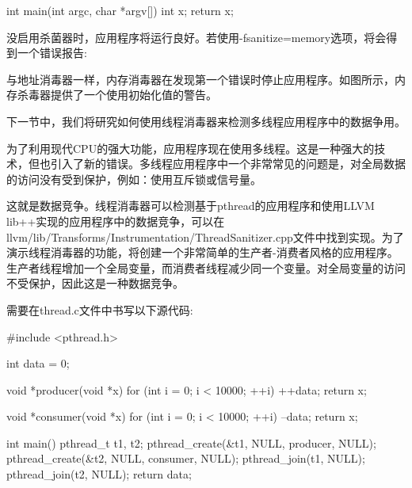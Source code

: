 \begin{cpp}
int main(int argc, char *argv[]) {
    int x;
    return x;
}
\end{cpp}

没启用杀菌器时，应用程序将运行良好。若使用-fsanitize=memory选项，将会得到一个错误报告:


与地址消毒器一样，内存消毒器在发现第一个错误时停止应用程序。如图所示，内存杀毒器提供了一个使用初始化值的警告。

下一节中，我们将研究如何使用线程消毒器来检测多线程应用程序中的数据争用。


为了利用现代CPU的强大功能，应用程序现在使用多线程。这是一种强大的技术，但也引入了新的错误。多线程应用程序中一个非常常见的问题是，对全局数据的访问没有受到保护，例如：使用互斥锁或信号量。

这就是数据竞争。线程消毒器可以检测基于pthread的应用程序和使用LLVM lib++实现的应用程序中的数据竞争，可以在llvm/lib/Transforms/Instrumentation/ThreadSanitizer.cpp文件中找到实现。为了演示线程消毒器的功能，将创建一个非常简单的生产者-消费者风格的应用程序。生产者线程增加一个全局变量，而消费者线程减少同一个变量。对全局变量的访问不受保护，因此这是一种数据竞争。

需要在thread.c文件中书写以下源代码:

\begin{cpp}
#include <pthread.h>

int data = 0;

void *producer(void *x) {
    for (int i = 0; i < 10000; ++i) ++data;
    return x;
}

void *consumer(void *x) {
    for (int i = 0; i < 10000; ++i) --data;
    return x;
}

int main() {
    pthread_t t1, t2;
    pthread_create(&t1, NULL, producer, NULL);
    pthread_create(&t2, NULL, consumer, NULL);
    pthread_join(t1, NULL);
    pthread_join(t2, NULL);
    return data;
}
\end{cpp}

